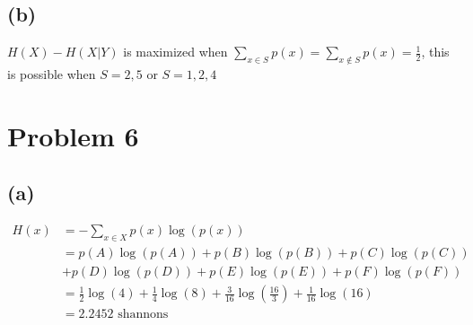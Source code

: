 \subsection*{(b)}
$H(X)-H(X|Y)$ is maximized when 
$\sum_{x\in S}p(x)=\sum_{x\notin S}p(x)=\frac{1}{2}$, this is possible
when $S=\boxed{2,5}$ or $S=\boxed{1,2,4}$
\section*{Problem 6}
\subsection*{(a)}
\begin{align*}
	H(x)&=-\sum_{x\in X} p(x)\log(p(x))\\
	&=p(A)\log(p(A))+p(B)\log(p(B))+p(C)\log(p(C))\\&+p(D)\log(p(D))+p(E)\log(p(E))+p(F)\log(p(F))\\
	&=\frac{1}{2}\log(4)+\frac{1}{4}\log(8)+\frac{3}{16}\log(\frac{16}{3})+\frac{1}{16}\log(16)\\
	&=\boxed{2.2452\text{ shannons}}
\end{align*}

